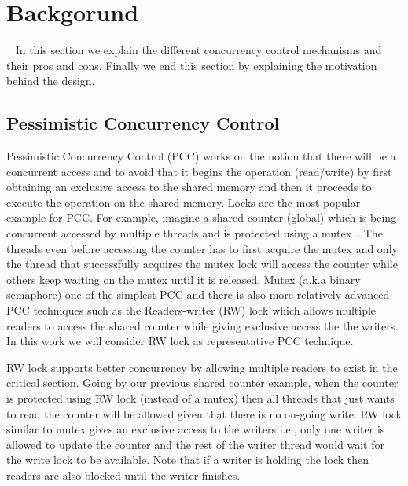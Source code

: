 \section{Backgorund}
\label{s:bg}

~\cite{wormhole-wu-eurosys19}
In this section we explain the different concurrency control mechanisms and
their pros and cons. Finally we end this section by explaining the motivation
behind the \sys design.

\subsection{Pessimistic Concurrency Control}
\label{s:bg:pcc}
Pessimistic Concurrency Control (PCC) works on the notion that there will be a
concurrent access and to avoid that it begins the operation (read/write) by
first obtaining an exclusive access to the shared memory and then it proceeds to
execute the operation on the shared memory. Locks are the most popular example
for PCC. For example, imagine a shared counter (global) which is being
concurrent accessed by multiple threads and is protected using a mutex~\cite{}. 
The threads even before accessing the counter has to first acquire the mutex and
only the thread that successfully acquires the mutex lock will access the
counter while others keep waiting on the mutex until it is released. Mutex
(a.k.a binary semaphore) one of the simplest PCC and there is also more
relatively advanced PCC techniques such as the Readers-writer (RW) lock which allows
multiple readers to access the shared counter while giving exclusive access the
the writers. In this work we will consider RW lock as representative PCC
technique. 

RW lock supports better concurrency by allowing multiple readers to exist in the
critical section. Going by our previous shared counter example, when the counter
is protected using RW lock (instead of a mutex) then all threads that just 
wants to read the counter will be allowed given that there is no on-going write.
RW lock similar to mutex gives an exclusive access to the writers i.e., only one
writer is allowed to update the counter and the rest of the writer thread would
wait for the write lock to be available. Note that if a writer is holding the
lock then readers are also blocked until the writer finishes. 

